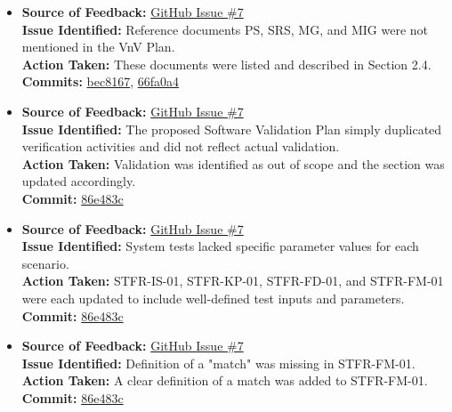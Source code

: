\documentclass{article}
\begin{document}
\begin{itemize}
  \item \textbf{Source of Feedback:} \href{https://github.com/KiranSingh15/CAS-741-Image-Correspondences/issues/7}{GitHub Issue \#7} \\
  \textbf{Issue Identified:} Reference documents PS, SRS, MG, and MIG were not mentioned in the VnV Plan. \\
  \textbf{Action Taken:} These documents were listed and described in Section 2.4. \\
  \textbf{Commits:} 
  \href{https://github.com/KiranSingh15/CAS-741-Image-Correspondences/commit/bec8167599e374f06193fd96d8b9e88414cd9e9a}{bec8167}, 
  \href{https://github.com/KiranSingh15/CAS-741-Image-Correspondences/commit/66fa0a4d2f9a725465743354ba8c35d4d53baa98}{66fa0a4}

  \item \textbf{Source of Feedback:} \href{https://github.com/KiranSingh15/CAS-741-Image-Correspondences/issues/7}{GitHub Issue \#7} \\
  \textbf{Issue Identified:} The proposed Software Validation Plan simply duplicated verification activities and did not reflect actual validation. \\
  \textbf{Action Taken:} Validation was identified as out of scope and the section was updated accordingly. \\
  \textbf{Commit:} \href{https://github.com/KiranSingh15/CAS-741-Image-Correspondences/commit/86e483c95394842de27e286edfe601c2bcebc5bb}{86e483c}

  \item \textbf{Source of Feedback:} \href{https://github.com/KiranSingh15/CAS-741-Image-Correspondences/issues/7}{GitHub Issue \#7} \\
  \textbf{Issue Identified:} System tests lacked specific parameter values for each scenario. \\
  \textbf{Action Taken:} STFR-IS-01, STFR-KP-01, STFR-FD-01, and STFR-FM-01 were each updated to include well-defined test inputs and parameters. \\
  \textbf{Commit:} \href{https://github.com/KiranSingh15/CAS-741-Image-Correspondences/commit/86e483c95394842de27e286edfe601c2bcebc5bb}{86e483c}

  \item \textbf{Source of Feedback:} \href{https://github.com/KiranSingh15/CAS-741-Image-Correspondences/issues/7}{GitHub Issue \#7} \\
  \textbf{Issue Identified:} Definition of a "match" was missing in STFR-FM-01. \\
  \textbf{Action Taken:} A clear definition of a match was added to STFR-FM-01. \\
  \textbf{Commit:} \href{https://github.com/KiranSingh15/CAS-741-Image-Correspondences/commit/86e483c95394842de27e286edfe601c2bcebc5bb}{86e483c}

\end{itemize}
\end{document}
